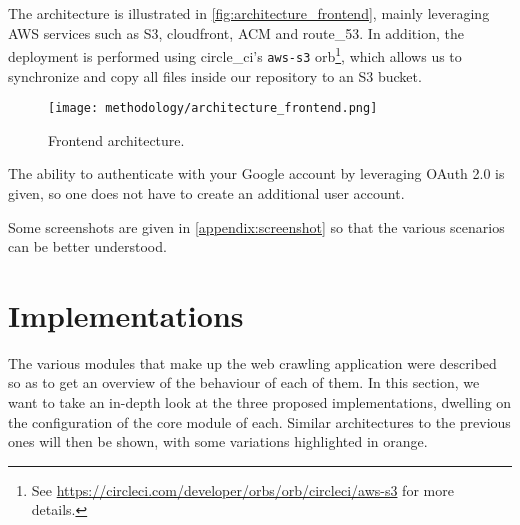 \documentclass[../thesis.tex]{subfiles}
\begin{document}
The architecture is illustrated in \autoref{fig:architecture_frontend}, mainly leveraging \acrshort{AWS} services such as \acrshort{S3}, \gls{cloudfront}, \acrshort{ACM} and \gls{route_53}. In addition, the deployment is performed using \gls{circle_ci}'s \texttt{aws-s3} orb\footnote{See \href{https://circleci.com/developer/orbs/orb/circleci/aws-s3}{https://circleci.com/developer/orbs/orb/circleci/aws-s3} for more details.}, which allows us to synchronize and copy all files inside our repository to an \acrshort{S3} bucket.

\begin{figure}[H]
    \centering
    \texttt{[image: methodology/architecture\_frontend.png]}
    \caption[Frontend architecture]{Frontend architecture.}
    \label{fig:architecture_frontend}
\end{figure}

The ability to authenticate with your Google account by leveraging \acrshort{OAuth 2.0} is given, so one does not have to create an additional user account.

Some screenshots are given in \autoref{appendix:screenshot} so that the various scenarios can be better understood.

\section{Implementations}\label{sec:implementations}
The various modules that make up the web crawling application were described so as to get an overview of the behaviour of each of them. In this section, we want to take an in-depth look at the three proposed implementations, dwelling on the configuration of the core module of each. Similar architectures to the previous ones will then be shown, with some variations highlighted in orange.
\end{document}
